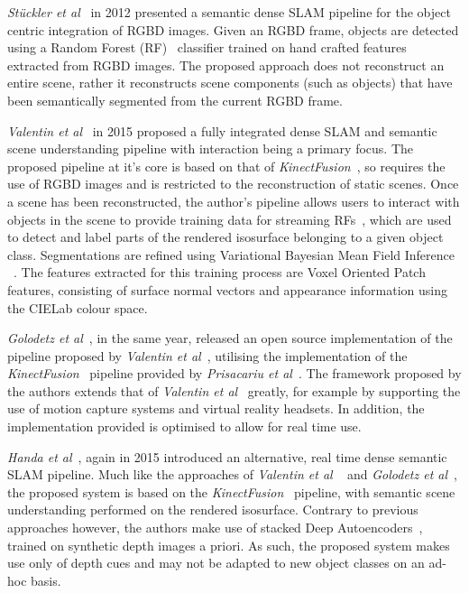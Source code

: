 \textit{St{\"u}ckler et al}~\cite{Stuckler2012} in 2012 presented a semantic dense SLAM 
pipeline for the object centric integration of RGBD images. Given an RGBD frame, objects 
are detected using a Random Forest (RF)~\cite{Ho1995} classifier trained on hand crafted features 
extracted from RGBD images. The proposed approach does not reconstruct an entire scene, rather it 
reconstructs scene components (such as objects) that have been semantically segmented 
from the current RGBD frame.

\textit{Valentin et al}~\cite{Valentin2015} in 2015 proposed a fully integrated dense SLAM 
and semantic scene understanding pipeline with interaction being a primary focus. The 
proposed pipeline at it's core is based on that of \textit{KinectFusion}~\cite{Newcombe2011}, 
so requires the use of RGBD images and is restricted to the reconstruction of static scenes. 
Once a scene has been reconstructed, the author's pipeline allows users to interact with 
objects in the scene to provide training data for streaming RFs~\cite{Abdulsalam2007}, 
which are used to detect and label parts of the rendered isosurface belonging to a given 
object class. Segmentations are refined using Variational Bayesian Mean Field Inference 
~\cite{Xing2002, Krahenbuhl2011}. The features extracted for this training 
process are Voxel Oriented Patch features, consisting of surface normal vectors
and appearance information using the CIELab colour space.

\textit{Golodetz et al}~\cite{Golodetz2015}, in the same year, released an open source 
implementation of the pipeline proposed by \textit{Valentin et al}~\cite{Valentin2015}, 
utilising the implementation of the \textit{KinectFusion}~\cite{Newcombe2011} pipeline 
provided by \textit{Prisacariu et al}~\cite{Prisacariu2014}. The framework proposed by 
the authors extends that of \textit{Valentin et al}~\cite{Valentin2015} greatly, for 
example by supporting the use of motion capture systems and virtual reality headsets. 
In addition, the implementation provided is optimised to allow for real time use.

\textit{Handa et al}~\cite{Handa2015}, again in 2015 introduced an alternative, 
real time dense semantic SLAM pipeline. Much like the approaches of \textit{Valentin et al} 
~\cite{Valentin2015} and \textit{Golodetz et al}~\cite{Golodetz2015}, the proposed system 
is based on the \textit{KinectFusion}~\cite{Newcombe2011} pipeline, with semantic scene 
understanding performed on the rendered isosurface. Contrary to previous approaches however, 
the authors make use of stacked Deep Autoencoders~\cite{Liou2008}, trained on synthetic depth 
images a priori. As such, the proposed system makes use only of depth cues and may not be 
adapted to new object classes on an ad-hoc basis.

